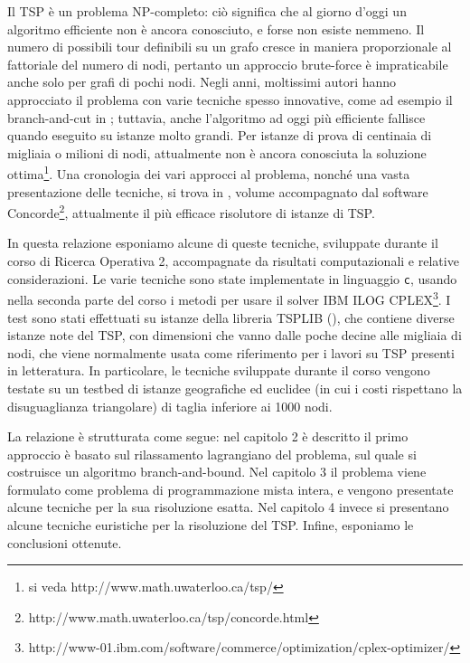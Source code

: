 Il TSP è un problema NP-completo: ciò significa che al giorno d'oggi un algoritmo efficiente non è ancora conosciuto, e forse non esiste nemmeno. Il numero di possibili tour definibili su un grafo cresce in maniera proporzionale al fattoriale del numero di nodi, pertanto un approccio brute-force è impraticabile anche solo per grafi di pochi nodi. Negli anni, moltissimi autori hanno approcciato il problema con varie tecniche spesso innovative, come ad esempio il branch-and-cut in \citet*{padberg1991branch}; tuttavia, anche l'algoritmo ad oggi più efficiente fallisce quando eseguito su istanze molto grandi. Per istanze di prova di centinaia di migliaia o milioni di nodi, attualmente non è ancora conosciuta la soluzione ottima\footnote{si veda http://www.math.uwaterloo.ca/tsp/}. Una cronologia dei vari approcci al problema, nonché una vasta presentazione delle tecniche, si trova in \citet*{applegate2011traveling}, volume accompagnato dal software Concorde\footnote{http://www.math.uwaterloo.ca/tsp/concorde.html}, attualmente il più efficace risolutore di istanze di TSP.

In questa relazione esponiamo alcune di queste tecniche, sviluppate durante il corso di Ricerca Operativa 2, accompagnate da risultati computazionali e relative considerazioni. Le varie tecniche sono state implementate in linguaggio \texttt{c}, usando nella seconda parte del corso i metodi per usare il solver IBM ILOG CPLEX\footnote{http://www-01.ibm.com/software/commerce/optimization/cplex-optimizer/}. I test sono stati effettuati su istanze della libreria TSPLIB (\citet*{reinelt1991tsplib}), che contiene diverse istanze note del TSP, con dimensioni che vanno dalle poche decine alle migliaia di nodi, che viene normalmente usata come riferimento per i lavori su TSP presenti in letteratura. In particolare, le tecniche sviluppate durante il corso vengono testate su un testbed di istanze geografiche ed euclidee (in cui i costi rispettano la disuguaglianza triangolare) di taglia inferiore ai 1000 nodi.

La relazione è strutturata come segue: nel capitolo 2 è descritto il primo approccio è basato sul rilassamento lagrangiano del problema, sul quale si costruisce un algoritmo branch-and-bound.  Nel capitolo 3 il problema viene formulato come problema di programmazione mista intera, e vengono presentate alcune tecniche per la sua risoluzione esatta. Nel capitolo 4 invece si presentano alcune tecniche euristiche per la risoluzione del TSP. Infine, esponiamo le conclusioni ottenute.
